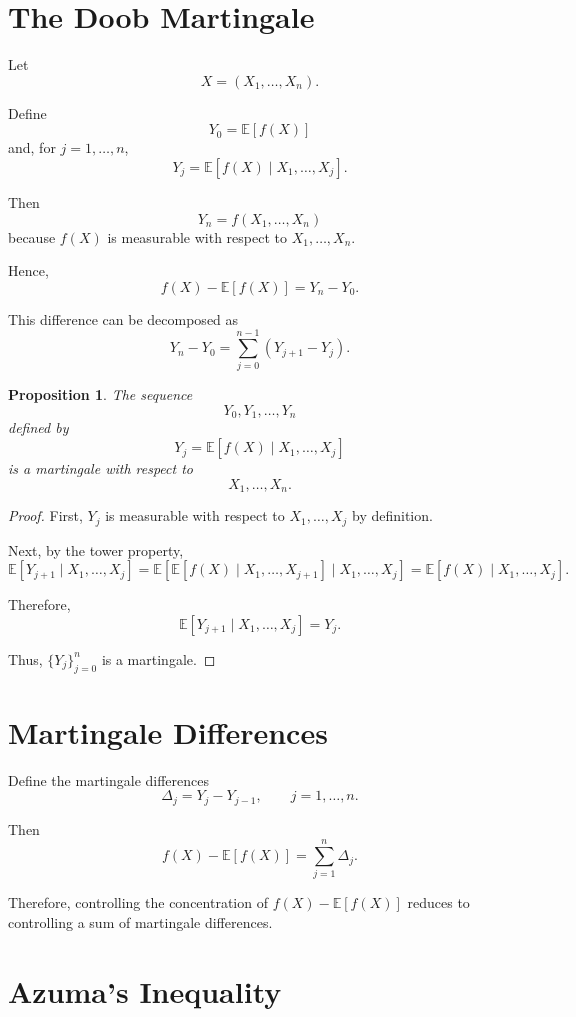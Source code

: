 \documentclass[12pt,oneside]{book}
\numberwithin{equation}{section}
\theoremstyle{definition}
\theoremstyle{plain}
\newtheorem{proposition}{Proposition}[section]
\theoremstyle{remark}
\newcommand{\E}{\mathbb{E}}
\begin{document}
\section{The Doob Martingale}

Let
\[
X=(X_1,\dots,X_n).
\]

Define
\[
Y_0
=
\E[f(X)]
\]
and, for $j=1,\dots,n$,
\[
Y_j
=
\E[f(X)\mid X_1,\dots,X_j].
\]

Then
\[
Y_n
=
f(X_1,\dots,X_n)
\]
because $f(X)$ is measurable with respect to $X_1,\dots,X_n$.

Hence,
\[
f(X)-\E[f(X)]
=
Y_n-Y_0.
\]

This difference can be decomposed as
\[
Y_n-Y_0
=
\sum_{j=0}^{n-1}(Y_{j+1}-Y_j).
\]

\begin{proposition}
The sequence
\[
Y_0,Y_1,\dots,Y_n
\]
defined by
\[
Y_j=\E[f(X)\mid X_1,\dots,X_j]
\]
is a martingale with respect to
\[
X_1,\dots,X_n.
\]
\end{proposition}

\begin{proof}
First, $Y_j$ is measurable with respect to $X_1,\dots,X_j$ by definition.

Next, by the tower property,
\[
\E[Y_{j+1}\mid X_1,\dots,X_j]
=
\E\left[
\E[f(X)\mid X_1,\dots,X_{j+1}]
\mid X_1,\dots,X_j
\right]
=
\E[f(X)\mid X_1,\dots,X_j].
\]

Therefore,
\[
\E[Y_{j+1}\mid X_1,\dots,X_j]
=
Y_j.
\]

Thus, $\{Y_j\}_{j=0}^n$ is a martingale.
\end{proof}

\section{Martingale Differences}

Define the martingale differences
\[
\Delta_j
=
Y_j-Y_{j-1},
\qquad
j=1,\dots,n.
\]

Then
\[
f(X)-\E[f(X)]
=
\sum_{j=1}^n \Delta_j.
\]

Therefore, controlling the concentration of $f(X)-\E[f(X)]$ reduces to controlling a sum of martingale differences.

\section{Azuma's Inequality}
\end{document}
